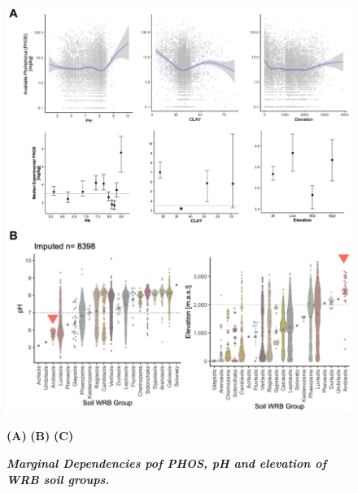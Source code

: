 \begin{figure}[!ht]
\centering
\includegraphics[width=\linewidth]{Chapter-2/figs/marginal_dependencies.png}
\caption[Marginal Dependencies pof PHOS. pH and elevation of WRB soil groups]{\textit{\textbf{Marginal Dependencies pof PHOS, pH and elevation of WRB soil groups.}}}
\textbf{(A)} 
\textbf{(B)}
\textbf{(C)}
\label{fig::\textbf{(B)}}
\end{figure}
\clearpage



